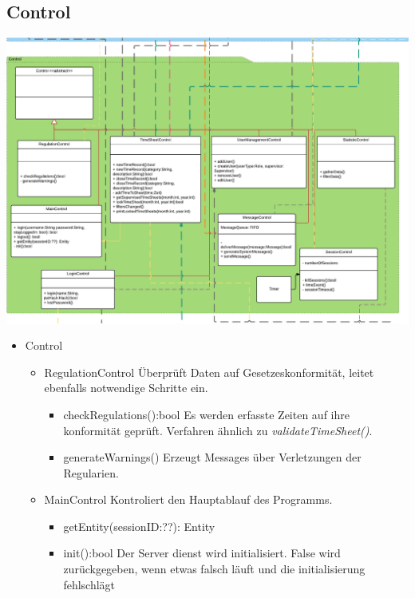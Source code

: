 \begin{itemize}
    \subsection{Control}
        \includegraphics[width=\linewidth]{Diagramms/class/control.pdf}\\
        \begin{itemize}
            \item{Control}
                \begin{itemize}
                    \item{RegulationControl}
                       Überprüft Daten auf Gesetzeskonformität, leitet ebenfalls notwendige Schritte ein.
                       \begin{itemize}
                           \item{checkRegulations():bool}
                            Es werden erfasste Zeiten auf ihre konformität geprüft.
                            Verfahren ähnlich zu \emph{validateTimeSheet()}.
                           \item{generateWarnings()}
                            Erzeugt Messages über Verletzungen der Regularien.
                       \end{itemize}

                    \item{MainControl}
                        Kontroliert den Hauptablauf des Programms.
                        \begin{itemize}
                             \item{getEntity(sessionID:??): Entity}
                             \item{init():bool}
                                Der Server dienst wird initialisiert.
                                False wird zurückgegeben, wenn etwas falsch läuft und die initialisierung fehlschlägt
                        \end{itemize}


\end{itemize}
\end{itemize}
\end{itemize}

